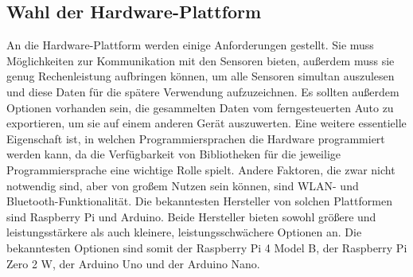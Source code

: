 \subsection{Wahl der Hardware-Plattform}
\label{subsec:elekMikrocontroller}
An die Hardware-Plattform werden einige Anforderungen gestellt. Sie muss Möglichkeiten zur Kommunikation mit den Sensoren bieten, außerdem muss sie genug Rechenleistung aufbringen können, um alle Sensoren simultan auszulesen und diese Daten für die spätere Verwendung aufzuzeichnen. Es sollten außerdem Optionen vorhanden sein, die gesammelten Daten vom ferngesteuerten Auto zu exportieren, um sie auf einem anderen Gerät auszuwerten. Eine weitere essentielle Eigenschaft ist, in welchen Programmiersprachen die Hardware programmiert werden kann, da die Verfügbarkeit von Bibliotheken für die jeweilige Programmiersprache eine wichtige Rolle spielt. Andere Faktoren, die zwar nicht notwendig sind, aber von großem Nutzen sein können, sind \ac{WLAN}- und Bluetooth-Funktionalität. Die bekanntesten Hersteller von solchen Plattformen sind Raspberry Pi und Arduino.  Beide Hersteller bieten sowohl größere und leistungsstärkere als auch kleinere, leistungsschwächere Optionen an. Die bekanntesten Optionen sind somit der Raspberry Pi 4 Model B, der Raspberry Pi Zero 2 W, der Arduino Uno und der Arduino Nano.
